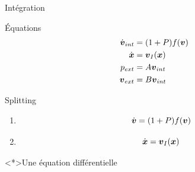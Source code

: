 \begin{frame}[<+->][shrink]{Intégration}
 \begin{block}{Équations}
  \begin{align*}
    \dot{{\boldsymbol {v}}}_{int}&=(1+P)f({\boldsymbol {v}})\\
    \dot{{\boldsymbol {x}}}&={\boldsymbol {v}}_{I}({\boldsymbol {x}})\\
     p_{ext}&=A{\boldsymbol {v}}_{int}\\
 {\boldsymbol {v}}_{ext}&=B{\boldsymbol {v}}_{int}
  \end{align*}
 \end{block}
 \begin{block}{Splitting}
 \begin{enumerate}[<*>]
  \item \begin{equation*}
         \dot{{\boldsymbol {v}}}=(1+P)f({\boldsymbol {v}})
        \end{equation*}
\item 
	\begin{equation*}
	\dot{{\boldsymbol {x}}}={\boldsymbol {v}}_{I}({\boldsymbol {x}})
	\end{equation*}
 \end{enumerate}
 \end{block}
\begin{block}<*>{Une équation différentielle}
\end{block}

\end{frame}

